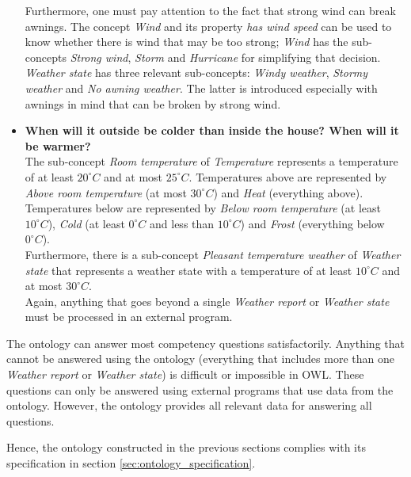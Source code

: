 \begin{itemize}
    Furthermore, one must pay attention to the fact that strong wind can break awnings. The concept \emph{Wind} and its property \emph{has wind speed} can be used to know whether there is wind that may be too strong; \emph{Wind} has the sub-concepts \emph{Strong wind}, \emph{Storm} and \emph{Hurricane} for simplifying that decision.\\
    \emph{Weather state} has three relevant sub-concepts: \emph{Windy weather}, \emph{Stormy weather} and \emph{No awning weather}. The latter is introduced especially with awnings in mind that can be broken by strong wind.
  \item \textbf{When will it outside be colder than inside the house? When will it be warmer?}\\
    The sub-concept \emph{Room temperature} of \emph{Temperature} represents a temperature of at least $20^\circ C$ and at most $25^\circ C$. Temperatures above are represented by \emph{Above room temperature} (at most $30^\circ C$) and \emph{Heat} (everything above). Temperatures below are represented by \emph{Below room temperature} (at least $10^\circ C$), \emph{Cold} (at least $0^\circ C$ and less than $10^\circ C$) and \emph{Frost} (everything below $0^\circ C$).\\
    Furthermore, there is a sub-concept \emph{Pleasant temperature weather} of \emph{Weather state} that represents a weather state with a temperature of at least $10^\circ C$ and at most $30^\circ C$.\\
    Again, anything that goes beyond a single \emph{Weather report} or \emph{Weather state} must be processed in an external program.
\end{itemize}

The \thinkhomeweather ontology can answer most competency questions satisfactorily. Anything that cannot be answered using the \thinkhomeweather ontology (everything that includes more than one \emph{Weather report} or \emph{Weather state}) is difficult or impossible in OWL. These questions can only be answered using external programs that use data from the \thinkhomeweather ontology. However, the ontology provides all relevant data for answering all questions.

Hence, the ontology constructed in the previous sections complies with its specification in section \ref{sec:ontology_specification}.

